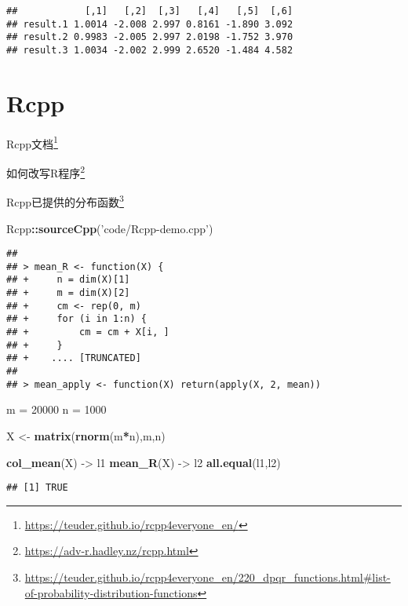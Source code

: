 \documentclass[]{ctexbook}
\newenvironment{Shaded}{\begin{snugshade}}{\end{snugshade}}
\newcommand{\DecValTok}[1]{\textcolor[rgb]{0.00,0.00,0.81}{#1}}
\newcommand{\KeywordTok}[1]{\textcolor[rgb]{0.13,0.29,0.53}{\textbf{#1}}}
\newcommand{\NormalTok}[1]{#1}
\newcommand{\OperatorTok}[1]{\textcolor[rgb]{0.81,0.36,0.00}{\textbf{#1}}}
\newcommand{\StringTok}[1]{\textcolor[rgb]{0.31,0.60,0.02}{#1}}
\renewcommand{\href}[2]{#2\footnote{\url{#1}}}
\begin{document}
\begin{verbatim}
##            [,1]   [,2]  [,3]   [,4]   [,5]  [,6]
## result.1 1.0014 -2.008 2.997 0.8161 -1.890 3.092
## result.2 0.9983 -2.005 2.997 2.0198 -1.752 3.970
## result.3 1.0034 -2.002 2.999 2.6520 -1.484 4.582
\end{verbatim}

\hypertarget{rcpp}{%
\section{Rcpp}\label{rcpp}}

\href{https://teuder.github.io/rcpp4everyone_en/}{Rcpp文档}

\href{https://adv-r.hadley.nz/rcpp.html}{如何改写R程序}

\href{https://teuder.github.io/rcpp4everyone_en/220_dpqr_functions.html\#list-of-probability-distribution-functions}{Rcpp已提供的分布函数}

\begin{Shaded}
\begin{Highlighting}[]
\NormalTok{Rcpp}\OperatorTok{::}\KeywordTok{sourceCpp}\NormalTok{(}\StringTok{'code/Rcpp-demo.cpp'}\NormalTok{)}
\end{Highlighting}
\end{Shaded}

\begin{verbatim}
## 
## > mean_R <- function(X) {
## +     n = dim(X)[1]
## +     m = dim(X)[2]
## +     cm <- rep(0, m)
## +     for (i in 1:n) {
## +         cm = cm + X[i, ]
## +     }
## +    .... [TRUNCATED] 
## 
## > mean_apply <- function(X) return(apply(X, 2, mean))
\end{verbatim}

\begin{Shaded}
\begin{Highlighting}[]
\NormalTok{m =}\StringTok{ }\DecValTok{20000}
\NormalTok{n =}\StringTok{ }\DecValTok{1000}

\NormalTok{X <-}\StringTok{ }\KeywordTok{matrix}\NormalTok{(}\KeywordTok{rnorm}\NormalTok{(m}\OperatorTok{*}\NormalTok{n),m,n)}

\KeywordTok{col_mean}\NormalTok{(X) ->}\StringTok{ }\NormalTok{l1}
\KeywordTok{mean_R}\NormalTok{(X) ->}\StringTok{ }\NormalTok{l2}
\KeywordTok{all.equal}\NormalTok{(l1,l2)}
\end{Highlighting}
\end{Shaded}

\begin{verbatim}
## [1] TRUE
\end{verbatim}
\end{document}
